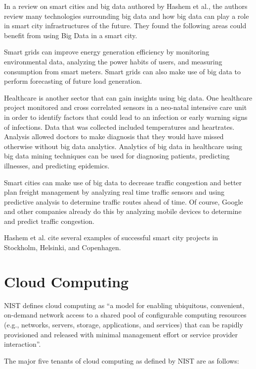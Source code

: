 \documentclass[]{article}
\begin{document}
In a review on smart cities and big data authored by Hashem et al.\cite{hashem_role_2016}, the authors review many technologies surrounding big data and how big data can play a role in smart city infrastructures of the future. They found the following areas could benefit from using Big Data in a smart city. 

Smart grids can improve energy generation efficiency by monitoring environmental data, analyzing the power habits of users, and measuring consumption from smart meters\cite{lai2015big}. Smart grids can also make use of big data to perform forecasting of future load generation\cite{al2015applications}. 

Healthcare is another sector that can gain insights using big data. One healthcare project monitored and cross correlated sensors in a neo-natal intensive care unit in order to identify factors that could lead to an infection or early warning signs of infections. Data that was collected included temperatures and heartrates. Analysis allowed doctors to make diagnosis that they would have missed otherwise without big data analytics\cite{ibm_healthcare}.  Analytics of big data in healthcare using big data mining techniques can be used for diagnosing patients, predicting illnesses, and predicting epidemics\cite{roy2007middleware}.

Smart cities can make use of big data to decrease traffic congestion and better plan freight management by analyzing real time traffic sensors and using predictive analysis to determine traffic routes ahead of time\cite{ADMA}. Of course, Google and other companies already do this by analyzing mobile devices to determine and predict traffic congestion.

Hashem et al.\cite{hashem_role_2016} cite several examples of successful smart city projects in Stockholm, Helsinki, and Copenhagen.


\section{Cloud Computing} \label{sec:cloud-computing}
NIST\cite{mell2011nist} defines cloud computing as ``a model for enabling ubiquitous, convenient, on-demand network access to a shared pool of configurable computing resources (e.g., networks, servers, storage, applications, and services) that can be rapidly provisioned and released with minimal management effort or service provider interaction''.

The major five tenants of cloud computing as defined by NIST are as follows: 
\end{document}
